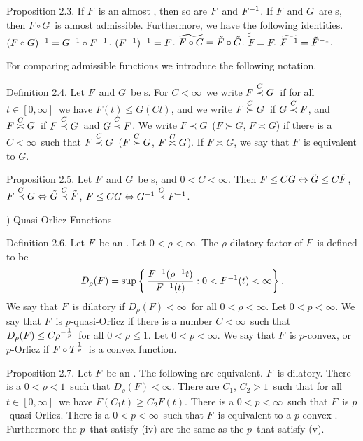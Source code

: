 \proclaim Proposition 2.3. If $F$\ is an almost \af, then so are
$\tilde F$ and
$F^{-1}$. If
$F$\ and $G$\ are \af s, then $F\circ G$\ is almost admissible. Furthermore,
we
have the following identities.
\itemi $(F\circ G)^{-1} = G^{-1}\circ F^{-1}$.
\itemii $(F^{-1})^{-1} = F$.
\itemiii $\widetilde{F\circ G} = \tilde F\circ\tilde G$.
\itemiv $\tilde{\tilde{{F}}} = F$.
\itemv $\widetilde{F^{-1}} = \tilde F^{-1}$.
 
For comparing admissible functions we introduce the following notation.
 
\proclaim Definition 2.4. Let $F$\ and $G$\ be \af s. For $C<\infty$\
we write
$F\labelledprec C G$\ if for all $t\in[0,\infty]$\ we have $F(t)\le
G(Ct)$, and
we write $F\labelledsucc C G$\ if $G\labelledprec C F$, and $F \labelledasymp
C
G$\ if $F\labelledprec C G$\ and $G\labelledprec C F$. We write $F\prec
G$\
($F\succ G$, $F\asymp G$) if there is a $C<\infty$\ such that
$F\labelledprec C G$\ ($F \labelledsucc C G$, $F \labelledasymp C
G$).
If $F\asymp G$, we say that $F$\ {\dt is equivalent to} $G$.
 
\proclaim Proposition 2.5. Let $F$\ and $G$\ be \af s, and $0<C<\infty$.
Then
\itemi $F\le CG \Leftrightarrow \tilde G \le C\tilde F$,
\itemii $F\labelledprec C G \Leftrightarrow \tG \labelledprec C \tF$,
\itemiii $F\le CG \Leftrightarrow \invG \labelledprec C \invF$.
 
\beginsection 2.1) Quasi-Orlicz Functions
 
\proclaim Definition 2.6. Let $F$\ be an \af.
\itemi Let $0<\rho<\infty$. The {\dt $\rho$-dilatory factor} of $F$\
is defined
to be
$$ D_\rho(F) = \sup \left\{\, {F^{-1}(\rho^{-1} t)\over F^{-1}(t)} :
   0 < F^{-1}(t) < \infty \right\} .$$
\itemii We say that $F$\ is {\dt dilatory} if $D_\rho(F)<\infty$\
for all
$0<\rho<\infty$.
\itemiii Let $0<p<\infty$. We say that $F$\ is {\dt $p$-quasi-Orlicz}
if there
is a number $C<\infty$\ such that $D_\rho(F) \le C\rho^{-{1\over p}}$\
for all
$0<\rho\le1$.
\itemiv Let $0<p<\infty$. We say that $F$\ is {\dt $p$-convex}, or
{\dt
$p$-Orlicz} if $F\circ T^{1\over p}$\ is a convex function.
\endit
 
\proclaim Proposition 2.7. Let $F$\ be an \af. The following are
equivalent.
\itemi $F$\ is dilatory.
\itemii There is a $0<\rho<1$\ such that $D_\rho(F)<\infty$.
\itemiii There are $C_1$, $C_2 > 1$\ such that for all $t\in [0,\infty]$\
we
have $F(C_1 t) \ge C_2 F(t)$.
\itemiv There is a $0<p<\infty$\ such that $F$\ is $p$-quasi-Orlicz.
\itemv There is a $0<p<\infty$\ such that $F$\ is equivalent to a
$p$-convex
\af.
\moreproclaim\noindent
Furthermore the $p$\ that satisfy (iv) are the same as the $p$\ that
satisfy
(v).
 
